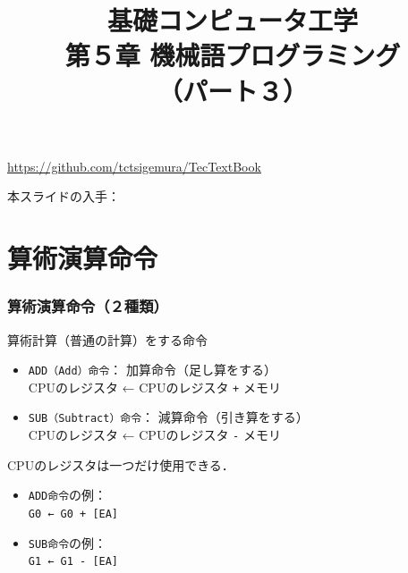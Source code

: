 \documentclass[handout]{beamer}        %
\begin{document}
\title{基礎コンピュータ工学\\第５章 機械語プログラミング\\（パート３）}
\date{}

\begin{frame}
  \titlepage
  \centerline{\url{https://github.com/tctsigemura/TecTextBook}}
  \vfill
  \centerline{本スライドの入手：
    }
\end{frame}


\section{算術演算命令}
\begin{frame}
  \frametitle{算術演算命令（２種類）}
  算術計算（普通の計算）をする命令
  \begin{itemize}
  \item \texttt{ADD（Add）命令}： 加算命令（足し算をする） \\
    CPUのレジスタ ← CPUのレジスタ \texttt{+} メモリ
  \item \texttt{SUB（Subtract）命令}： 減算命令（引き算をする） \\
    CPUのレジスタ ← CPUのレジスタ \texttt{-} メモリ
  \end{itemize}
  \vfill
  CPUのレジスタは一つだけ使用できる．\\
  \begin{itemize}
  \item \texttt{ADD命令}の例：\\
    \texttt{G0 ← G0 + [EA]}
  \item \texttt{SUB命令}の例：\\
    \texttt{G1 ← G1 - [EA]}
  \end{itemize}
\end{frame}
\end{document}
